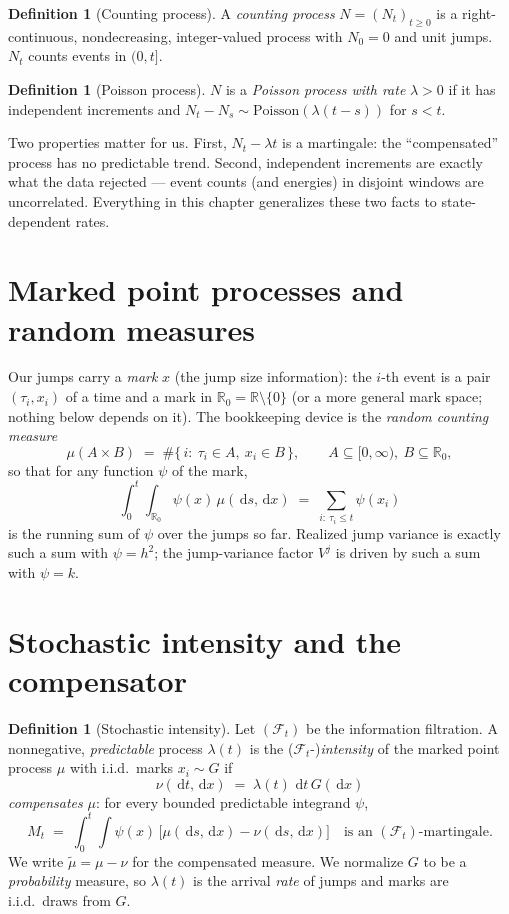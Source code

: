 \documentclass[11pt]{report}
\theoremstyle{definition}
\newtheorem{definition}[theorem]{Definition}
\theoremstyle{remark}
\newcommand{\R}{\mathbb{R}}
\newcommand{\F}{\mathcal{F}}
\newcommand{\dd}{\,\mathrm{d}}
\newcommand{\Vj}{V^{j}}
\begin{document}
\begin{definition}[Counting process]
A \emph{counting process} $N=(N_t)_{t\ge 0}$ is a right-continuous,
nondecreasing, integer-valued process with $N_0=0$ and unit jumps. $N_t$
counts events in $(0,t]$.
\end{definition}

\begin{definition}[Poisson process]
$N$ is a \emph{Poisson process with rate} $\lambda>0$ if it has independent
increments and $N_t-N_s\sim\mathrm{Poisson}(\lambda(t-s))$ for $s<t$.
\end{definition}

Two properties matter for us. First, $N_t-\lambda t$ is a martingale: the
``compensated'' process has no predictable trend. Second, independent
increments are exactly what the data rejected --- event counts (and energies)
in disjoint windows are uncorrelated. Everything in this chapter generalizes
these two facts to state-dependent rates.

\section{Marked point processes and random measures}

Our jumps carry a \emph{mark} $x$ (the jump size information): the $i$-th
event is a pair $(\tau_i, x_i)$ of a time and a mark in $\R_0=\R\setminus\{0\}$
(or a more general mark space; nothing below depends on it). The bookkeeping
device is the \emph{random counting measure}
\[
\mu(A\times B) \;=\; \#\{\,i:\ \tau_i\in A,\ x_i\in B\,\},
\qquad A\subseteq[0,\infty),\ B\subseteq\R_0 ,
\]
so that for any function $\psi$ of the mark,
\[
\int_{0}^{t}\!\!\int_{\R_0}\psi(x)\,\mu(\dd s,\dd x)
\;=\;\sum_{i:\ \tau_i\le t}\psi(x_i)
\]
is the running sum of $\psi$ over the jumps so far. Realized jump variance is
exactly such a sum with $\psi=h^{2}$; the jump-variance factor $\Vj$ is
driven by such a sum with $\psi=k$.

\section{Stochastic intensity and the compensator}

\begin{definition}[Stochastic intensity]\label{def:intensity}
Let $(\F_t)$ be the information filtration. A nonnegative,
\emph{predictable} process $\lambda(t)$ is the ($\F_t$-)\emph{intensity} of
the marked point process $\mu$ with i.i.d.\ marks $x_i\sim G$ if
\[
\nu(\dd t,\dd x)\;=\;\lambda(t)\,\dd t\,G(\dd x)
\]
\emph{compensates} $\mu$: for every bounded predictable integrand
$\psi$,
\begin{equation}\label{eq:compensation}
M_{t}\;=\;\int_{0}^{t}\!\!\int \psi(x)\,\big[\mu(\dd s,\dd x)-\nu(\dd s,\dd x)\big]
\quad\text{is an $(\F_t)$-martingale.}
\end{equation}
We write $\tilde\mu = \mu-\nu$ for the compensated measure. We normalize
$G$ to be a \emph{probability} measure, so $\lambda(t)$ is the arrival
\emph{rate} of jumps and marks are i.i.d.\ draws from $G$.
\end{definition}
\end{document}
